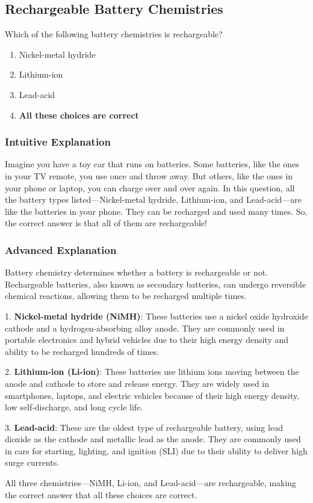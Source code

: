 \subsection{Rechargeable Battery Chemistries}
\label{T6A10}

\begin{tcolorbox}[colback=gray!10!white,colframe=black!75!black,title=T6A10]
Which of the following battery chemistries is rechargeable?
\begin{enumerate}[label=\Alph*)]
    \item Nickel-metal hydride
    \item Lithium-ion
    \item Lead-acid
    \item \textbf{All these choices are correct}
\end{enumerate}
\end{tcolorbox}

\subsubsection{Intuitive Explanation}
Imagine you have a toy car that runs on batteries. Some batteries, like the ones in your TV remote, you use once and throw away. But others, like the ones in your phone or laptop, you can charge over and over again. In this question, all the battery types listed—Nickel-metal hydride, Lithium-ion, and Lead-acid—are like the batteries in your phone. They can be recharged and used many times. So, the correct answer is that all of them are rechargeable!

\subsubsection{Advanced Explanation}
Battery chemistry determines whether a battery is rechargeable or not. Rechargeable batteries, also known as secondary batteries, can undergo reversible chemical reactions, allowing them to be recharged multiple times. 

1. \textbf{Nickel-metal hydride (NiMH)}: These batteries use a nickel oxide hydroxide cathode and a hydrogen-absorbing alloy anode. They are commonly used in portable electronics and hybrid vehicles due to their high energy density and ability to be recharged hundreds of times.

2. \textbf{Lithium-ion (Li-ion)}: These batteries use lithium ions moving between the anode and cathode to store and release energy. They are widely used in smartphones, laptops, and electric vehicles because of their high energy density, low self-discharge, and long cycle life.

3. \textbf{Lead-acid}: These are the oldest type of rechargeable battery, using lead dioxide as the cathode and metallic lead as the anode. They are commonly used in cars for starting, lighting, and ignition (SLI) due to their ability to deliver high surge currents.

All three chemistries—NiMH, Li-ion, and Lead-acid—are rechargeable, making the correct answer that all these choices are correct.

